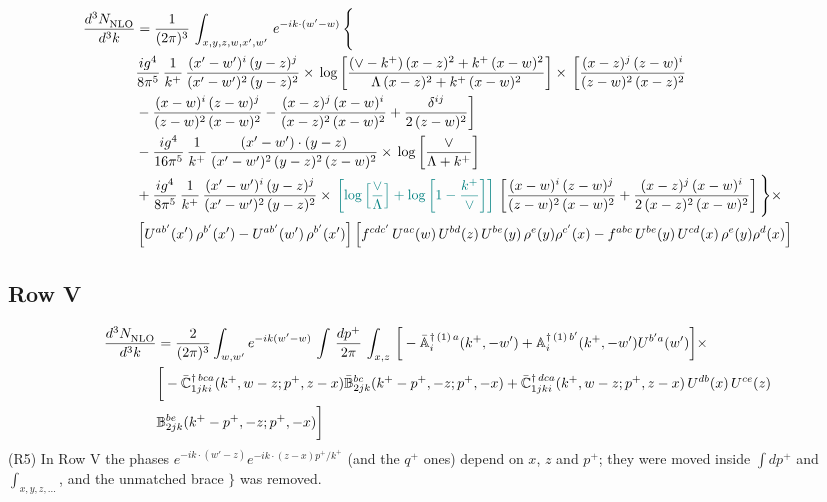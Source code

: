 \documentclass[9pt]{article}
\def\mf#1{\mathbb{#1}}
\numberwithin{equation}{section}
\begin{document}
\begin{align}
    \frac{d^{3}N_{\rm NLO}^{\rm}}{d^{3}k}  & =  \frac{1}{(2\pi)^{3}}\,
    \int_{x,y,z,w,x',w'}\,e^{-ik\cdot (w^\prime-w)}\,\Bigg\{\notag \\ & \frac{ig^{4}}{8\pi^{5}}\,\frac{1}{k^{+}}\,\frac{(x'-w')^{i}\,(y-z)^{j}}{(x'-w')^{2}\,(y-z)^{2}}\times\,\log{\left[\frac{(\vee-k^{+})\,(x-z)^{2}+k^{+}\,(x-w)^{2}}{\Lambda\, (x-z)^{2} + k^{+}\,(x-w)^{2}}\right]}\times\, \bigg[\frac{(x-z)^{j}\,(z-w)^{i}}{(z-w)^{2}\,(x-z)^{2}}\notag \\ & -\frac{(x-w)^{i}\,(z-w)^{j}}{(z-w)^{2}\,(x-w)^{2}}-\frac{(x-z)^{j}\,(x-w)^{i}}{(x-z)^{2}\,(x-w)^{2}}+\frac{\delta^{ij}}{2\,(z-w)^{2}}\bigg]\notag \\ & -\frac{ig^{4}}{16\pi^{5}}\,\frac{1}{k^{+}}\,\frac{(x'-w')\cdot (y-z)}{(x'-w')^{2}\,(y-z)^{2}\,(z-w)^{2}}\times\,\log{\left[\frac{\vee}{\Lambda + k^{+}}\right]}\notag \\ & + \frac{ig^{4}}{8\pi^{5}}\,\frac{1}{k^{+}}\,\frac{(x'-w')^{i}\,(y-z)^{j}}{(x'-w')^{2}\,(y-z)^{2}}\times\,{\color{teal}\left[\log{\left[\frac{\vee}{\Lambda}\right]} + \log{\left[1-\frac{k^{+}}{\vee}\right]}\right]}\,\left[\frac{(x-w)^{i}\,(z-w)^{j}}{(z-w)^{2}\,(x-w)^{2}}+\frac{(x-z)^{j}\,(x-w)^{i}}{2\, (x-z)^{2}\,(x-w)^{2}}\right] \Bigg\}\times\notag \\ &  \left[U^{ab'}(x')\,\rho^{b'}(x')-U^{ab'}(w')\,\rho^{b'}(x')\right] \left[f^{cdc'}\,U^{ac}(w)\,U^{bd}(z)\,U^{be}(y)\,\rho^{e}(y)\rho^{c'}(x)-f^{abc}\,U^{be}(y)\,U^{cd}(x)\,\rho^{e}(y)\rho^{d}(x)\right]
\end{align}
\subsection{Row V}
\begin{align}
    \frac{d^{3}N_{\rm NLO}^{\rm}}{d^{3}k}  & = \frac{2}{(2\pi)^{3}}  \int_{w, w^\prime} e^{-ik(w^\prime-w)}\, \int\, \frac{dp^{+}}{2\pi}\,\int_{x,z}\, \bigg[-\bar{\mf{A}}^{\dagger\,(1)\,a}_{i}(k^{+},-w^{\prime})+\mf{A}^{\dagger\, (1)\, b^{\prime}}_{i}(k^{+},-w^{\prime})U^{b^{\prime}a}(w^{\prime})\bigg]\times\notag \\ & \bigg[-\Bar{\mf{C}}^{\dagger\, bca}_{1jki}(k^{+},w-z;p^{+},z-x)\Bar{\mf{B}}^{bc}_{2jk}(k^{+}-p^{+},- z;p^{+},-x)+\bar{\mf{C}}^{\dagger\, dca}_{1jki}(k^+,w-z; p^+, z-x)\,U^{db}(x)\,U^{ce}(z) \notag \\ & {\mf{B}}^{be}_{2jk} (k^{+}-p^+, -z; p^+, -x) \bigg]\nonumber
\end{align}
{\color{blue}(R5) In Row V the phases $e^{-ik\cdot(w'-z)}e^{-ik\cdot(z-x)p^{+}/k^{+}}$ (and the $q^{+}$ ones) depend on $x$, $z$ and $p^{+}$; they were moved inside $\int dp^{+}$ and $\int_{x,y,z,\dots}$, and the unmatched brace $\Bigg\}$ was removed.}
\end{document}
